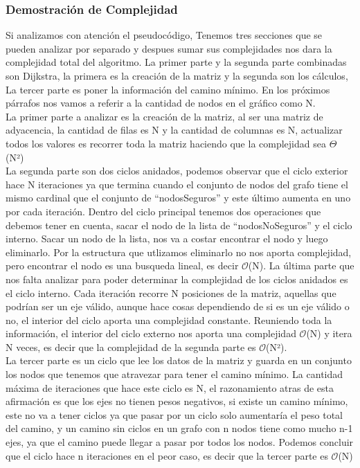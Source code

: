 \documentclass[spanish,12pt]{article}
\begin{document}
\subsubsection{Demostración de Complejidad}

Si analizamos con atención el pseudocódigo, Tenemos tres secciones que se pueden analizar por separado y despues sumar sus complejidades nos dara la complejidad total del algoritmo. La primer parte y la segunda parte combinadas son Dijkstra, la primera es la creación de la matriz y la segunda son los cálculos, La tercer parte es poner la información del camino mínimo. En los próximos párrafos nos vamos a referir a la cantidad de nodos en el gráfico como N. 
\\
	 La primer parte a analizar es la creación de la matriz, al ser una matriz de adyacencia, la cantidad de filas es N y la cantidad de columnas es N, actualizar todos los valores es recorrer toda la matriz haciendo que la complejidad sea $\Theta$(N²)
\\
	La segunda parte son dos ciclos anidados, podemos observar que el ciclo exterior hace N iteraciones ya que termina cuando el conjunto de nodos del grafo tiene el mismo cardinal que el conjunto de ``nodosSeguros'' y este último aumenta en uno por cada iteración. Dentro del ciclo principal tenemos dos operaciones que debemos tener en cuenta, sacar el nodo de la lista de ``nodosNoSeguros'' y el ciclo interno. Sacar un nodo de la lista, nos va a costar encontrar el nodo y luego eliminarlo. Por la estructura que utlizamos eliminarlo no nos aporta complejidad, pero encontrar el nodo es una busqueda lineal, es decir $\mathcal{O}$(N). La última parte que nos falta analizar para poder determinar la complejidad de los ciclos anidados es el ciclo interno. Cada iteración recorre N posiciones de la matriz, aquellas que podrían ser un eje válido, aunque hace cosas dependiendo de si es un eje válido o no, el interior del ciclo aporta una complejidad constante. Reuniendo toda la información, el interior del ciclo externo nos aporta una complejidad $\mathcal{O}$(N) y itera N veces, es decir que la complejidad de la segunda parte es $\mathcal{O}$(N²).
\\
	 La tercer parte es un ciclo que lee los datos de la matriz y guarda en un conjunto los nodos que tenemos que atravezar para tener el camino mínimo. La cantidad máxima de iteraciones que hace este ciclo es N, el razonamiento atras de esta afirmación es que los ejes no tienen pesos negativos, si existe un camino mínimo, este no va a tener ciclos ya que pasar por un ciclo solo aumentaría el peso total del camino, y un camino sin ciclos en un grafo con n nodos tiene como mucho n-1 ejes, ya que el camino puede llegar a pasar por todos los nodos. Podemos concluir que el ciclo hace n iteraciones en el peor caso, es decir que la tercer parte es $\mathcal{O}$(N)
\end{document}
